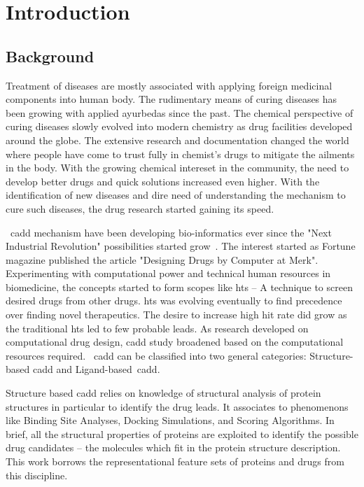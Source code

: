 \setcounter{page}{1}
\chapter{Introduction}
\section{Background}
Treatment of diseases are mostly associated with applying foreign medicinal components into human body. The rudimentary means of curing diseases has been growing with applied ayurbedas since the past. The chemical perspective of curing diseases slowly evolved into modern chemistry as drug facilities developed around the globe. The extensive research and documentation changed the world where people have come to trust fully in chemist's drugs to mitigate the ailments in the body. With the growing chemical intereset in the community, the need to develop better drugs and quick solutions increased even higher. With the identification of new diseases and dire need of understanding the mechanism to cure such diseases, the drug research started gaining its speed.

~\acrfull{cadd} mechanism have been developing bio-informatics ever since the "Next Industrial Revolution" possibilities started grow~\cite{Leelananda2016,Brown2017}. The interest started as Fortune magazine published the article "Designing Drugs by Computer at Merk". Experimenting with computational power and technical human resources in biomedicine, the concepts started to form scopes like \acrfull{hts} -- A technique to screen desired drugs from other drugs. \acrshort{hts} was evolving eventually to find precedence over finding novel therapeutics. The desire to increase high hit rate did grow as the traditional \acrshort{hts} led to few probable leads. As research developed on computational drug design, \acrshort{cadd} study broadened based on the computational resources required. ~\acrshort{cadd} can be classified into two general categories: Structure-based \acrshort{cadd} and Ligand-based~\acrshort{cadd}.

Structure based \acrshort{cadd} relies on knowledge of structural analysis of protein structures in particular to identify the drug leads. It associates to phenomenons like Binding Site Analyses, Docking Simulations, and Scoring Algorithms. In brief, all the structural properties of proteins are exploited to identify the possible drug candidates -- the molecules which fit in the protein structure description. This work borrows the representational feature sets of proteins and drugs from this discipline.

